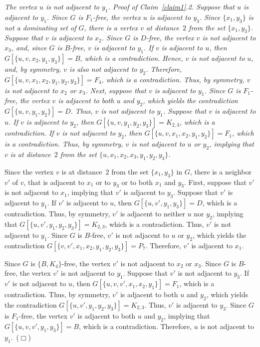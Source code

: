 \documentclass[12pt]{article}
\newcommand{\smallqed}{{\tiny ($\Box$)}}
\newenvironment{unnumbered}[1]{\trivlist \item [\hskip \labelsep {\bf
#1}]\ignorespaces\it}{\endtrivlist}
\begin{document}
\begin{unnumbered}{Claim~\ref{claim1}.2}
The vertex $u$ is not adjacent to $y_1$.
\end{unnumbered}
{\it Proof of Claim~\ref{claim1}.2.} Suppose that $u$ is adjacent to $y_1$.
Since $G$ is $F_1$-free, the vertex $u$ is adjacent to $y_3$.
Since $\{x_1, y_3\}$ is not a dominating set of $G$,
there is a vertex $v$ at distance~$2$ from the set $\{x_1,y_3\}$.
Suppose that $v$ is adjacent to $x_2$.
Since $G$ is $D$-free, the vertex $v$ is not adjacent to $x_3$, and,
since $G$ is $B$-free, $v$ is adjacent to $y_1$.
If $v$ is adjacent to $u$, then $G[\{u,v,x_2, y_1, y_3\}]=B$, which is a contradiction.
Hence, $v$ is not adjacent to $u$, and, by symmetry, $v$ is also not adjacent to $y_2$.  
Therefore, $G[\{u,v,x_1, x_2, y_1, y_2, y_3\}]=F_4$, which is a contradiction.
Thus, by symmetry, $v$ is not adjacent to $x_2$ or $x_3$.
Next, suppose that $v$ is adjacent to $y_1$.
Since $G$ is $F_1$-free, the vertex $v$ is adjacent to both $u$ and $y_2$, which yields the contradiction $G[\{u,v,y_1, y_2\}]=D$.
Thus, $v$ is not adjacent to $y_1$.
Suppose that $v$ is adjacent to $u$.
If $v$ is adjacent to $y_2$, then $G[\{u,v, y_1,y_2, y_3\}]=K_{2,3}$, which is a contradiction.
If $v$ is not adjacent to $y_2$, then $G[\{u,v, x_1, x_2,y_1,y_2\}]=F_1$, which is a contradiction.
Thus, by symmetry, $v$ is not adjacent to $u$ or $y_2$, implying that $v$ is at distance~$2$ from the set $\{ u,x_1,x_2,x_3,y_1,y_2,y_3\}$.

Since the vertex $v$ is at distance~$2$ from the set $\{x_1,y_3\}$ in $G$, 
there is a neighbor $v'$ of $v$, that is adjacent to $x_1$ or to $y_3$ or to both $x_1$ and $y_3$.
First, suppose that $v'$ is not adjacent to $x_1$, implying that $v'$ is adjacent to $y_3$.
Suppose that $v'$ is adjacent to $y_1$. If $v'$ is adjacent to $u$, then $G[\{u,v',y_1,y_3\}] = D$, which is a contradiction. Thus, by symmetry, $v'$ is adjacent to neither $u$ nor $y_2$, implying that
$G[\{u,v', y_1, y_2, y_3\}]=K_{2,3}$, which is a contradiction.
Thus, $v'$ is not adjacent to $y_1$.
Since $G$ is $B$-free, $v'$ is not adjacent to $u$ or $y_2$, which yields the contradiction $G[\{v,v',x_1, x_2, y_1, y_2, y_3\}]=P_7$.
Therefore, $v'$ is adjacent to $x_1$.

Since $G$ is $\{B,K_4\}$-free, the vertex $v'$ is not adjacent to $x_2$ or $x_3$.
Since $G$ is $B$-free, the vertex $v'$ is not adjacent to $y_1$.
Suppose that $v'$ is not adjacent to $y_3$.
If $v'$ is not adjacent to $u$, then $G[\{u,v, v', x_1, x_2, y_1\}]=F_1$, which is a contradiction.
Thus, by symmetry, $v'$ is adjacent to both $u$ and $y_2$, which yields the contradiction $G[\{u,v', y_1, y_2, y_3\}]=K_{2,3}$.
Thus, $v'$ is adjacent to $y_3$.
Since $G$ is $F_1$-free, the vertex $v'$ is adjacent to both $u$ and $y_2$, implying that $G[\{u,v,v', y_1, y_3\}]=B$, which is a contradiction. Therefore, $u$ is not adjacent to $y_1$.~\smallqed
\end{document}
